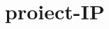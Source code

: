 \chapter{proiect-\/\+IP }
\hypertarget{md__r_e_a_d_m_e}{}\label{md__r_e_a_d_m_e}
\label{md__r_e_a_d_m_e_autotoc_md0}%
%
